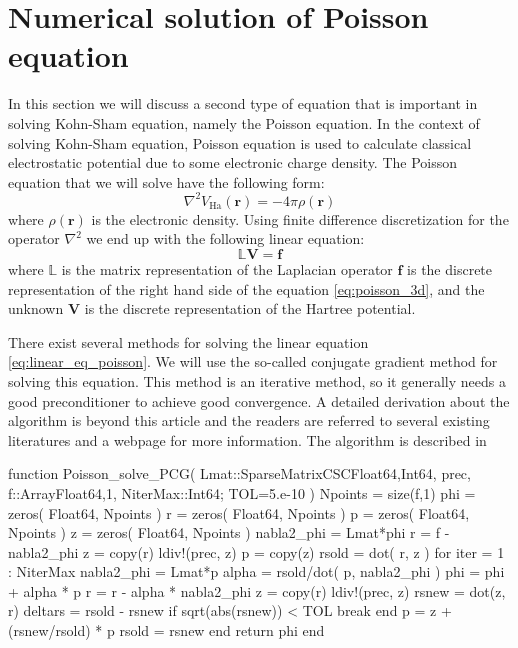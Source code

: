 \chapter{Numerical solution of Poisson equation}

In this section we will discuss a second type of equation
that is important in solving Kohn-Sham equation,
namely the Poisson equation. In the
context of solving Kohn-Sham equation, Poisson equation is used to
calculate classical electrostatic potential due to some electronic
charge density.
The Poisson equation that we will solve have the following form:
\begin{equation}
\nabla^2 V_{\mathrm{Ha}}(\mathbf{r}) = -4\pi\rho(\mathbf{r})
\label{eq:poisson_3d}
\end{equation}
where $\rho(\mathbf{r})$ is the electronic density. Using finite
difference discretization for the operator $\nabla^2$ we end up with
the following linear equation:
\begin{equation}
\mathbb{L} \mathbf{V} = \mathbf{f}
\label{eq:linear_eq_poisson}
\end{equation}
where $\mathbb{L}$ is the matrix representation of the Laplacian operator
$\mathbf{f}$ is the discrete representation of the right hand side of the equation
\ref{eq:poisson_3d}, and the unknown $\mathbf{V}$ is the discrete representation of
the Hartree potential.

There exist several methods for solving the linear equation \ref{eq:linear_eq_poisson}.
We will use the so-called conjugate gradient method for solving this equation.
This method is an iterative method, so it generally needs a good preconditioner to
achieve good convergence. A detailed derivation about the algorithm is beyond this
article and the readers are referred to several existing literatures \cite{Hestenes1952,Shewchuk1994}
and a webpage \cite{wiki-Conjugate-gradient} for more
information. The algorithm is described in 

\begin{juliacode}
function Poisson_solve_PCG( Lmat::SparseMatrixCSC{Float64,Int64},
                            prec,
                            f::Array{Float64,1}, NiterMax::Int64;
                            TOL=5.e-10 )
  Npoints = size(f,1)
  phi = zeros( Float64, Npoints )
  r = zeros( Float64, Npoints )
  p = zeros( Float64, Npoints )
  z = zeros( Float64, Npoints )
  nabla2_phi = Lmat*phi
  r = f - nabla2_phi
  z = copy(r)
  ldiv!(prec, z)
  p = copy(z)
  rsold = dot( r, z )
  for iter = 1 : NiterMax
    nabla2_phi = Lmat*p
    alpha = rsold/dot( p, nabla2_phi )
    phi = phi + alpha * p
    r = r - alpha * nabla2_phi
    z = copy(r)
    ldiv!(prec, z)
    rsnew = dot(z, r)
    deltars = rsold - rsnew
    if sqrt(abs(rsnew)) < TOL
      break
    end
    p = z + (rsnew/rsold) * p
    rsold = rsnew
  end
  return phi
end
\end{juliacode}

